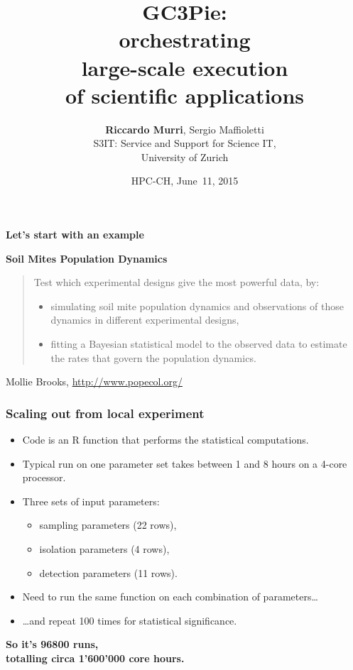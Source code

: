 \documentclass[english,serif,mathserif,xcolor=pdftex,dvipsnames,table]{beamer}
\title[GC3Pie]{%
  GC3Pie: \\
  orchestrating \\ large-scale execution \\ of scientific applications
}
\author[R.~Murri]{%
  \textbf{Riccardo Murri}, Sergio Maffioletti \\
  S3IT: Service and Support for Science IT, \\
  University of Zurich
}
\date{HPC-CH, June~11, 2015}
\begin{document}
\maketitle

\begin{frame}
  \begin{center}
    \bfseries\huge
    {Let's start with an example}
  \end{center}
\end{frame}


\begin{frame}
  \begin{center}
    \textbf{Soil Mites Population Dynamics}
  \end{center}

  \begin{quote}
    Test which experimental designs give the most powerful data, by:
    \begin{itemize}
    \item simulating soil mite population dynamics and observations of
      those dynamics in different experimental designs,
    \item fitting a Bayesian statistical model to the observed data to
      estimate the rates that govern the population dynamics.
    \end{itemize}
  \end{quote}

  \begin{center}
    \+ Mollie Brooks, \url{http://www.popecol.org/}
  \end{center}
\end{frame}

\begin{frame}
  \frametitle{Scaling out from local experiment}
  \begin{itemize}
  \item Code is an R function that performs the statistical computations.
  \item Typical run on one parameter set takes between 1 and 8 hours
    on a 4-core processor.
    \pause
  \item Three sets of input parameters:
    \begin{itemize}
    \item sampling parameters (22 rows),
    \item isolation parameters (4 rows),
    \item detection parameters (11 rows).
    \end{itemize}
    \pause
  \item Need to run the same function on each combination of
    parameters\ldots
  \item \ldots and repeat 100 times for statistical significance.
  \end{itemize}

    \pause
  \begin{center}
    {\bf So it's 96800 runs, \\ totalling circa 1'600'000 core hours.}
  \end{center}
\end{frame}
\end{document}
